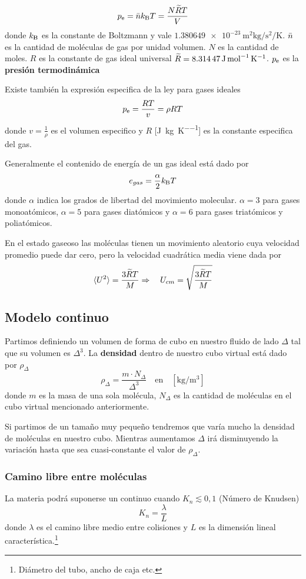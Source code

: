 \begin{equation} \label{eq:idealGasesLaw}
    \pe= \moldens \boltzmann T=\frac{N\overtilde{R}T}{V}
\end{equation}
donde $\boltzmann$ es la constante de Boltzmann y vale $\SI{1.380649e-23}{\meter \squared \kilogram \per \second \squared \per \kelvin}$. $\bar{n}$ es la cantidad de moléculas de gas por unidad volumen. $N$ es la cantidad de moles. $R$ es la constante de gas ideal universal $\widetilde{R}=\SI{8,31447}{\joule \per \mole \per \kelvin}$. $\pe$ es la \textbf{presión termodinámica}

Existe también la expresión especifica de la ley para gases ideales
\[
\pe = \frac{RT}{v} = \rho R T
\]
donde $v=\frac{1}{\rho}$ es el volumen especifico y  $R$ [\si{\joule \per \kilogram \per \kelvin}] es la constante especifica del gas.

Generalmente el contenido de energía de un gas ideal está dado por
\begin{equation}
    e_{gas}=\frac{\alpha}{2}\boltzmann T
\end{equation}
donde $\alpha$ indica los grados de libertad del movimiento molecular. $\alpha=3$ para gases monoatómicos, $\alpha=5$ para gases diatómicos y $\alpha=6$ para gases triatómicos y poliatómicos.

En el estado gaseoso las moléculas tienen un movimiento aleatorio cuya velocidad promedio puede dar cero, pero la velocidad cuadrática media viene dada por
\[
\langle U^2 \rangle = \frac{3\widetilde{R}T}{M} \Rightarrow \quad U_{cm}=\sqrt{\frac{3\widetilde{R}T}{M}}
\]

\subsection{Modelo continuo}
Partimos definiendo un volumen de forma de cubo en nuestro fluido de lado $\Delta$ tal que su volumen es $\Delta^3$. La \textbf{densidad}  dentro de nuestro cubo virtual está dado por $\rho_\Delta$ 
\[
\rho_\Delta = \frac{m\cdot N_\Delta}{\Delta^3} \quad \textrm{en} \quad [\si{\kilogram \per \meter \cubed}]
\]
donde $m$ es la masa de una sola molécula, $N_\Delta$ es la cantidad de moléculas en el cubo virtual mencionado anteriormente.

Si partimos de un tamaño muy pequeño tendremos que varía mucho la densidad de moléculas en nuestro cubo. Mientras aumentamos $\Delta$ irá disminuyendo la variación hasta que sea cuasi-constante el valor de $\rho_\Delta$. 

\subsubsection*{Camino libre entre moléculas}
La materia podrá suponerse un continuo cuando $K_n\lesssim 0,1$ (Número de Knudsen)
\[
K_n = \frac{\lambda}{L}
\]
donde $\lambda$ es el camino libre medio entre colisiones y $L$ es la dimensión lineal característica.\footnote{Diámetro del tubo, ancho de caja etc.}

